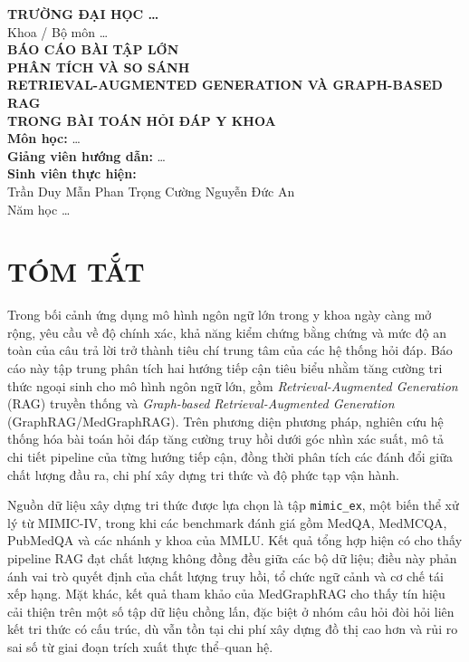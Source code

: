 \documentclass[a4paper,12pt,twoside]{report}
\title{\bfseries \TITLE}
\author{\AUTHOR}
\date{}
\def\TITLE{BÁO CÁO BÀI TẬP LỚN\\PHÂN TÍCH VÀ SO SÁNH\\RETRIEVAL-AUGMENTED GENERATION VÀ GRAPH-BASED RAG\\TRONG BÀI TOÁN HỎI ĐÁP Y KHOA}
\def\AUTHOR{Trần Duy Mẫn \quad Phan Trọng Cường \quad Nguyễn Đức An}
\begin{document}
\begin{titlepage}
  \centering
  \vspace*{2cm}
  {\Large \bfseries TRƯỜNG ĐẠI HỌC \ldots}\\[0.5cm]
  {\large Khoa / Bộ môn \ldots}\\[2.5cm]
  {\LARGE \bfseries \TITLE}\\[2cm]
  {\large \textbf{Môn học:} \ldots}\\[0.5cm]
  {\large \textbf{Giảng viên hướng dẫn:} \ldots}\\[2cm]
  {\large \textbf{Sinh viên thực hiện:}}\\[0.3cm]
  {\large \AUTHOR}\\[3cm]
  {\large Năm học \ldots}
  \vfill
\end{titlepage}

\tableofcontents
\thispagestyle{empty}
\newpage

\listoffigures
\newpage

\listoftables
\newpage

\chapter*{TÓM TẮT}
Trong bối cảnh ứng dụng mô hình ngôn ngữ lớn trong y khoa ngày càng mở rộng, yêu cầu về độ chính xác, khả năng kiểm chứng bằng chứng và mức độ an toàn của câu trả lời trở thành tiêu chí trung tâm của các hệ thống hỏi đáp. Báo cáo này tập trung phân tích hai hướng tiếp cận tiêu biểu nhằm tăng cường tri thức ngoại sinh cho mô hình ngôn ngữ lớn, gồm \textit{Retrieval-Augmented Generation} (RAG) truyền thống và \textit{Graph-based Retrieval-Augmented Generation} (GraphRAG/MedGraphRAG). Trên phương diện phương pháp, nghiên cứu hệ thống hóa bài toán hỏi đáp tăng cường truy hồi dưới góc nhìn xác suất, mô tả chi tiết pipeline của từng hướng tiếp cận, đồng thời phân tích các đánh đổi giữa chất lượng đầu ra, chi phí xây dựng tri thức và độ phức tạp vận hành.

Nguồn dữ liệu xây dựng tri thức được lựa chọn là tập \texttt{mimic\_ex}, một biến thể xử lý từ MIMIC-IV, trong khi các benchmark đánh giá gồm MedQA, MedMCQA, PubMedQA và các nhánh y khoa của MMLU. Kết quả tổng hợp hiện có cho thấy pipeline RAG đạt chất lượng không đồng đều giữa các bộ dữ liệu; điều này phản ánh vai trò quyết định của chất lượng truy hồi, tổ chức ngữ cảnh và cơ chế tái xếp hạng. Mặt khác, kết quả tham khảo của MedGraphRAG cho thấy tín hiệu cải thiện trên một số tập dữ liệu chồng lấn, đặc biệt ở nhóm câu hỏi đòi hỏi liên kết tri thức có cấu trúc, dù vẫn tồn tại chi phí xây dựng đồ thị cao hơn và rủi ro sai số từ giai đoạn trích xuất thực thể--quan hệ.
\end{document}
